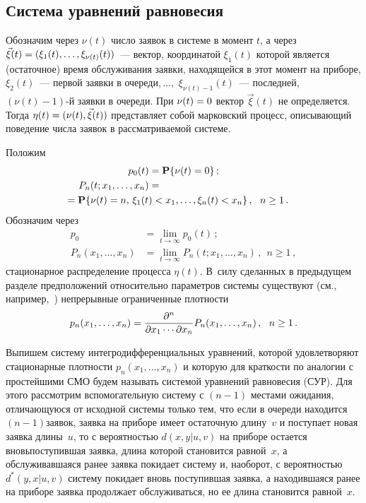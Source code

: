 \begin{multicols}{2}
\section{Система уравнений равновесия}

Обозначим через $\nu(t)$ число заявок в системе
в момент $t$, а через $\vec\xi(t)\hm=
(\xi_{1}(t),\ldots,\xi_{\nu(t)}(t))$~---
вектор, координатой $\xi_{1}(t)$ которой
является (остаточное) время обслуживания
заявки, находящейся в этот момент на приборе,
$\xi_{2}(t)$~--- первой заявки в
очереди$,\ldots,$ $\xi_{\nu(t)-1}(t)$~---
последней, \mbox{$(\nu(t)-1)$-й} заявки в очереди.
При $\nu(t)\hm=0$ вектор $\vec\xi(t)$
не определяется.
Тогда $\eta(t)\hm=(\nu(t),\vec\xi(t))$ представляет
собой марковский процесс, описывающий
поведение числа заявок в рассматриваемой сис\-теме.

Положим
\begin{align*}
p_{0}(t) &= {\bf P}\{\nu(t)=0\} \,;
\\
P_{n}(t;x_1,\ldots,x_{n})
&= {}\\
&\hspace*{-30mm}{}={\bf P}\{\nu(t)=n,\, \xi_{1}(t)<x_{1},\ldots,\xi_{n}(t)<x_{n}\}
\,,\ \ n\ge 1\,.
\end{align*}
Обозначим через
\begin{align*}
p_{0} &= \lim\limits_{t\to\infty} p_{0}(t) \,;
\\
P_{n}(x_1,\ldots,x_{n}) &=
\lim\limits_{t\to\infty} P_{n}(t;x_1,\ldots,x_{n})\,,\ \ n\ge 1\,,
\end{align*}
стационарное распределение процесса $\eta(t)$.
В~силу сделанных в предыдущем разделе
предположений относительно параметров системы
существуют (см., например,~\cite{ppav})
непрерывные ограниченные плотности
\begin{equation*}
p_n(x_1,\ldots,x_{n}) =
\displaystyle\frac{\displaystyle \partial^n\mathstrut}{\displaystyle \partial x_1\cdots \partial x_n\mathstrut}
P_n(x_1,\ldots,x_{n}) \,,\ \ n\ge 1\,.
\end{equation*}

Выпишем систему интегродифференциальных
уравнений, которой удовлетворяют стационарные
плотности $p_n(x_1,\ldots,x_{n})$ и которую
для краткости по аналогии с простейшими СМО
будем называть системой уравнений равновесия (СУР).
Для этого рассмотрим вспомогательную систему
с $(n-1)$ мес\-та\-ми ожидания, отличающуюся от исходной
сис\-те\-мы только тем, что если в очереди
находится $(n-1)$\linebreak заявок, заявка на приборе имеет
остаточную длину~$v$ и поступает новая заявка
длины~$u$, то с вероятностью $d(x,y|u,v)$ на
приборе остается вновь\linebreak поступившая заявка,
длина которой становится равной~$x$, а
обслуживавшаяся ранее заявка покидает
систему и, наоборот, с вероятностью
$d^*(y,x|u,v)$ систему покидает вновь
поступившая заявка, а находившаяся ранее на
приборе заявка продолжает обслуживаться, но
ее длина становится равной~$x$.


\end{multicols}
